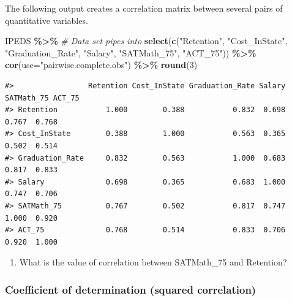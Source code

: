 \documentclass[
]{report}
\newenvironment{Shaded}{\begin{snugshade}}{\end{snugshade}}
\newcommand{\AttributeTok}[1]{\textcolor[rgb]{0.13,0.29,0.53}{#1}}
\newcommand{\CommentTok}[1]{\textcolor[rgb]{0.56,0.35,0.01}{\textit{#1}}}
\newcommand{\DecValTok}[1]{\textcolor[rgb]{0.00,0.00,0.81}{#1}}
\newcommand{\FunctionTok}[1]{\textcolor[rgb]{0.13,0.29,0.53}{\textbf{#1}}}
\newcommand{\NormalTok}[1]{#1}
\newcommand{\SpecialCharTok}[1]{\textcolor[rgb]{0.81,0.36,0.00}{\textbf{#1}}}
\newcommand{\StringTok}[1]{\textcolor[rgb]{0.31,0.60,0.02}{#1}}
\providecommand{\tightlist}{%
  \setlength{\itemsep}{0pt}\setlength{\parskip}{0pt}}
\begin{document}
The following output creates a correlation matrix between several pairs of quantitative variables.

\begin{Shaded}
\begin{Highlighting}[]
\NormalTok{IPEDS }\SpecialCharTok{\%\textgreater{}\%}  \CommentTok{\# Data set pipes into}
  \FunctionTok{select}\NormalTok{(}\FunctionTok{c}\NormalTok{(}\StringTok{"Retention"}\NormalTok{, }\StringTok{"Cost\_InState"}\NormalTok{, }
           \StringTok{"Graduation\_Rate"}\NormalTok{, }\StringTok{"Salary"}\NormalTok{, }
           \StringTok{"SATMath\_75"}\NormalTok{, }\StringTok{"ACT\_75"}\NormalTok{)) }\SpecialCharTok{\%\textgreater{}\%}
  \FunctionTok{cor}\NormalTok{(}\AttributeTok{use=}\StringTok{"pairwise.complete.obs"}\NormalTok{) }\SpecialCharTok{\%\textgreater{}\%}
  \FunctionTok{round}\NormalTok{(}\DecValTok{3}\NormalTok{)}
\end{Highlighting}
\end{Shaded}

\begin{verbatim}
#>                 Retention Cost_InState Graduation_Rate Salary SATMath_75 ACT_75
#> Retention           1.000        0.388           0.832  0.698      0.767  0.768
#> Cost_InState        0.388        1.000           0.563  0.365      0.502  0.514
#> Graduation_Rate     0.832        0.563           1.000  0.683      0.817  0.833
#> Salary              0.698        0.365           0.683  1.000      0.747  0.706
#> SATMath_75          0.767        0.502           0.817  0.747      1.000  0.920
#> ACT_75              0.768        0.514           0.833  0.706      0.920  1.000
\end{verbatim}

\begin{enumerate}
\def\labelenumi{\arabic{enumi}.}
\setcounter{enumi}{4}
\tightlist
\item
  What is the value of correlation between SATMath\_75 and Retention?
\end{enumerate}

\vspace{0.3in}

\subsubsection*{Coefficient of determination (squared correlation)}\label{coefficient-of-determination-squared-correlation}
\end{document}
